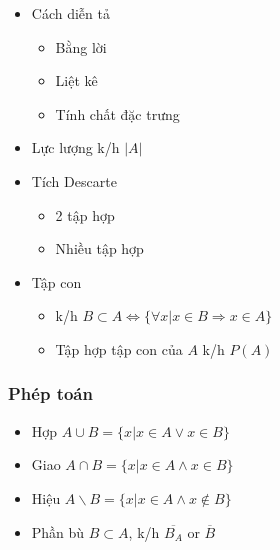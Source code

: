 \documentclass[11pt]{article}
\providecommand{\tightlist}{%
      \setlength{\itemsep}{0pt}\setlength{\parskip}{0pt}}
\begin{document}
    \begin{itemize}
\item
  Cách diễn tả

  \begin{itemize}
  \item
    Bằng lời
  \item
    Liệt kê
  \item
    Tính chất đặc trưng
  \end{itemize}
\end{itemize}

    \begin{itemize}
\tightlist
\item
  Lực lượng k/h \(|A|\)
\end{itemize}

    \begin{itemize}
\item
  Tích Descarte

  \begin{itemize}
  \item
    2 tập hợp
  \item
    Nhiều tập hợp
  \end{itemize}
\end{itemize}

    \begin{itemize}
\item
  Tập con

  \begin{itemize}
  \item
    k/h
    \(B \subset A \Leftrightarrow \{ \forall x | x \in B \Rightarrow x \in A\}\)
  \item
    Tập hợp tập con của \(A\) k/h \(P(A)\)
  \end{itemize}
\end{itemize}

    \subsubsection{Phép toán}\label{phuxe9p-touxe1n}

    \begin{itemize}
\tightlist
\item
  Hợp \(A \cup B = \{ x | x \in A \lor x \in B \}\)
\item
  Giao \(A \cap B = \{ x | x \in A \land x \in B \}\)
\item
  Hiệu \(A \backslash B = \{ x | x \in A \land x \notin B \}\)
\item
  Phần bù \(B \subset A\), k/h \(\overline{B_A}\) or \(\overline{B}\)
\end{itemize}
\end{document}
